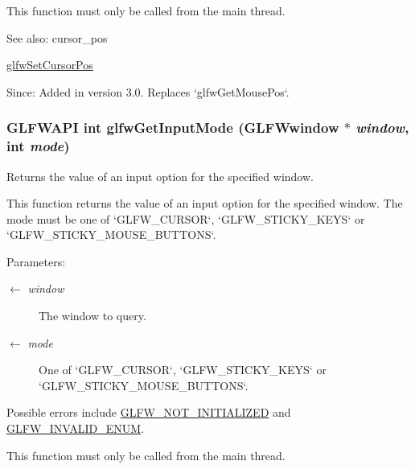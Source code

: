 This function must only be called from the main thread.

\begin{Desc}
\item[See also:]cursor\_\-pos 

\hyperlink{group__input_gaf152cc93418acb0ba342e3f4af922bc}{glfwSetCursorPos}\end{Desc}
\begin{Desc}
\item[Since:]Added in version 3.0. Replaces `glfwGetMousePos`. \end{Desc}
\hypertarget{group__input_g1248dd5b1e566b2817e71547564d6af9}{
\subsubsection[glfwGetInputMode]{\setlength{\rightskip}{0pt plus 5cm}GLFWAPI int glfwGetInputMode ({\bf GLFWwindow} $\ast$ {\em window}, \/  int {\em mode})}}
\label{group__input_g1248dd5b1e566b2817e71547564d6af9}


Returns the value of an input option for the specified window. 

This function returns the value of an input option for the specified window. The mode must be one of `GLFW\_\-CURSOR`, `GLFW\_\-STICKY\_\-KEYS` or `GLFW\_\-STICKY\_\-MOUSE\_\-BUTTONS`.

\begin{Desc}
\item[Parameters:]
\begin{description}
\item[\mbox{$\leftarrow$} {\em window}]The window to query. \item[\mbox{$\leftarrow$} {\em mode}]One of `GLFW\_\-CURSOR`, `GLFW\_\-STICKY\_\-KEYS` or `GLFW\_\-STICKY\_\-MOUSE\_\-BUTTONS`.\end{description}
\end{Desc}
Possible errors include \hyperlink{group__errors_g2374ee02c177f12e1fa76ff3ed15e14a}{GLFW\_\-NOT\_\-INITIALIZED} and \hyperlink{group__errors_g76f6bb9c4eea73db675f096b404593ce}{GLFW\_\-INVALID\_\-ENUM}.

This function must only be called from the main thread.

